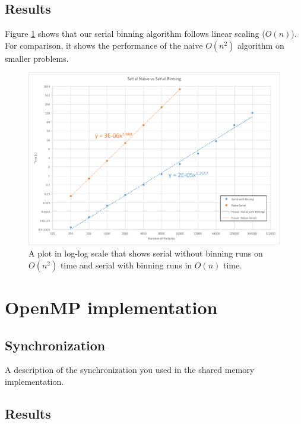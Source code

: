 \documentclass[12pt]{article}
\begin{document}
\subsection{Results}
Figure \ref{fig:serial-on} shows that our serial binning algorithm follows linear scaling ($O(n)$). For comparison, it shows the performance of the naive $O(n^2)$ algorithm on smaller problems.

\begin{figure}
 \includegraphics[width=\textwidth]{graphs/serial_binning_vs_naive.png}
  \caption{A plot in log-log scale that shows serial without binning runs on $O(n^2)$ time and serial with binning runs in $O(n)$ time.}
  \label{fig:serial-on}
\end{figure}

\section{OpenMP implementation}

\subsection{Synchronization}
A description of the synchronization you used in the shared memory implementation.

\subsection{Results}
\end{document}
